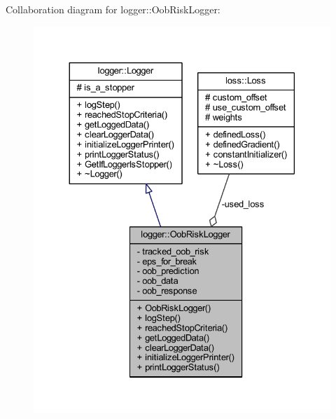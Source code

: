 Collaboration diagram for logger\+:\+:Oob\+Risk\+Logger\+:
\nopagebreak
\begin{figure}[H]
\begin{center}
\leavevmode
\includegraphics[width=330pt]{classlogger_1_1_oob_risk_logger__coll__graph}
\end{center}
\end{figure}
